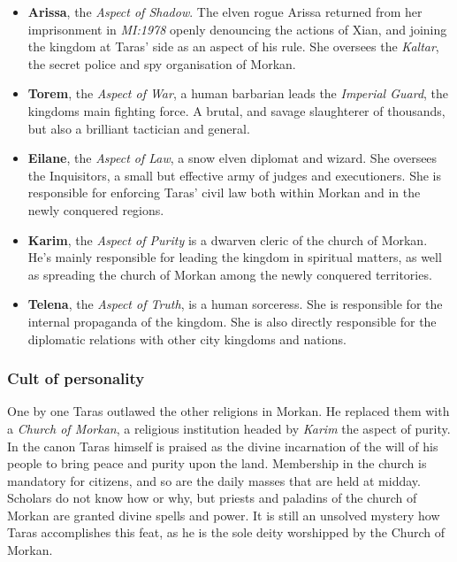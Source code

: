 \begin{itemize}[noitemsep]
  \item \textbf{Arissa}, the \emph{Aspect of Shadow}. The elven rogue Arissa
    returned from her imprisonment in \emph{MI:1978} openly denouncing the
    actions of Xian, and joining the kingdom at Taras' side as an aspect of
    his rule. She oversees the \emph{Kaltar}, the secret police and spy
    organisation of Morkan.

  \item \textbf{Torem}, the \emph{Aspect of War}, a human barbarian leads the
    \emph{Imperial Guard}, the kingdoms main fighting force. A brutal, and
    savage slaughterer of thousands, but also a brilliant tactician and
    general.

  \item \textbf{Eilane}, the \emph{Aspect of Law}, a snow elven diplomat and
    wizard. She oversees the Inquisitors, a small but effective army of judges
    and executioners. She is responsible for enforcing Taras' civil law both
    within Morkan and in the newly conquered regions.

  \item \textbf{Karim}, the \emph{Aspect of Purity} is a dwarven cleric of the
    church of Morkan. He's mainly responsible for leading the kingdom in
    spiritual matters, as well as spreading the church of Morkan among the
    newly conquered territories.

  \item \textbf{Telena}, the \emph{Aspect of Truth}, is a human sorceress. She
    is responsible for the internal propaganda of the kingdom. She is also
    directly responsible for the diplomatic relations with other city kingdoms
    and nations.

\end{itemize}

\subsubsection*{Cult of personality}

One by one Taras outlawed the other religions in Morkan. He replaced them with
a \emph{Church of Morkan}, a religious institution headed by \emph{Karim} the
aspect of purity. In the canon Taras himself is praised as the divine
incarnation of the will of his people to bring peace and purity upon the
land. Membership in the church is mandatory for citizens, and so are the daily
masses that are held at midday. Scholars do not know how or why, but priests
and paladins of the church of Morkan are granted divine spells and power. It
is still an unsolved mystery how Taras accomplishes this feat, as he is the
sole deity worshipped by the Church of Morkan.

